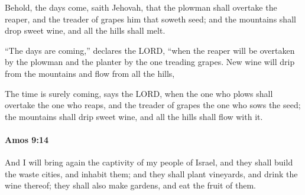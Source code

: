 			\begin{versebox}
					\item[BHS] 
					\item[LXX] 
					\item[ASV] Behold, the days come, saith Jehovah, that the plowman shall overtake the reaper, and the treader of grapes him that soweth seed; and the mountains shall drop sweet wine, and all the hills shall melt.
					\item[NIV] “The days are coming,” declares the LORD, “when the reaper will be overtaken by the plowman and the planter by the one treading grapes. New wine will drip from the mountains and flow from all the hills,
					\item[NRSV] The time is surely coming, says the LORD, when the one who plows shall overtake the one who reaps, and the treader of grapes the one who sows the seed; the mountains shall drip sweet wine, and all the hills shall flow with it.
			\end{versebox}

		\paragraph{Amos 9:14} %
			\label{AMOS-9-14}

			And I will bring again the captivity of my people of Israel, and they shall build the waste cities, and inhabit them; and they shall plant vineyards, and drink the wine thereof; they shall also make gardens, and eat the fruit of them.

